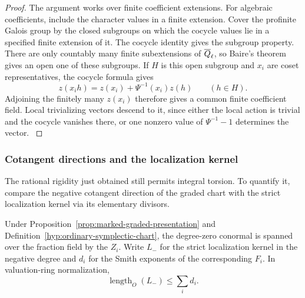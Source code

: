 \begin{proof}
The argument works over finite coefficient extensions.
For algebraic coefficients, include the character values in a finite extension. Cover the profinite Galois group by the closed subgroups on which the cocycle values lie in a specified finite extension of it.
The cocycle identity gives the subgroup property. There are
only countably many finite subextensions of
\(\overline{Q}_\ell\), so Baire's theorem gives an open one of
these subgroups. If \(H\) is this open subgroup and \(x_i\) are coset
representatives, the cocycle formula gives
\[
        z(x_i h)=z(x_i)+\Psi^{-1}(x_i)z(h)\qquad(h\in H).
\]
Adjoining the finitely many \(z(x_i)\) therefore gives a common
finite coefficient field. Local trivializing vectors descend to it, since either
the local action is trivial and the cocycle vanishes there, or
one nonzero value of \(\Psi^{-1}-1\) determines the vector.
\label{cor:ordinary-symplectic-cohomology-6}

\end{proof}

\subsubsection{Cotangent directions and the localization kernel}

The rational rigidity just obtained still permits integral torsion. To quantify it, compare the negative cotangent direction of the graded chart with the strict localization kernel via its elementary divisors.

\begin{proposition}\label{prop:marked-cotangent-kernel}
Under Proposition~\ref{prop:marked-graded-presentation} and
Definition~\ref{hyp:ordinary-symplectic-chart}, the degree-zero conormal is spanned over the fraction field by
the \(Z_i\). Write \(L_-\) for the strict localization kernel in the negative degree and \(d_i\) for the Smith exponents of the corresponding \(F_i\). In valuation-ring normalization, 
\[
 \operatorname{length}_{O}(L_-)\le\sum_i d_i.
\]

\end{proposition}


